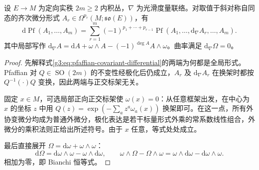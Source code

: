 \begin{lemma}\label{g3:lem:pfaffian-covariant-differential}
	设 \(E\to M\) 为定向实秩 \(2m\ge2\) 内积丛，\(\nabla\) 为光滑度量联络。对取值于斜对称自同态的齐次微分形式 \(A_r\in\Omega^{p_r}(M;\mathfrak{so}(E))\)，有
	\begin{equation}\label{g3:eq:pfaffian-covariant-differential}
		\mathrm d\operatorname{Pf}(A_1,\ldots,A_m)
		=\sum_{r=1}^m(-1)^{p_1+\cdots+p_{r-1}}
		\operatorname{Pf}(A_1,\ldots,\mathrm d_\nabla A_r,\ldots,A_m).
	\end{equation}
	其中局部写作 \(\mathrm d_\nabla A=\mathrm dA+\omega\wedge A-(-1)^{\deg A}A\wedge\omega\)。曲率满足 \(\mathrm d_\nabla\Omega=0\)。
\end{lemma}
\begin{proof}
	先解释式\eqref{g3:eq:pfaffian-covariant-differential}的两端为何都是全局形式。Pfaffian 对 \(Q\in\operatorname{SO}(2m)\) 的不变性经极化后仍成立，\(A_r\) 及 \(\mathrm d_\nabla A_r\) 在换架时都按 \(Q^{-1}(\cdot)Q\) 变换，因此两端与正交标架无关。

	固定 \(x\in M\)，可选局部正向正交标架使 \(\omega(x)=0\)：从任意框架出发，在中心为 \(x\) 的坐标 \(z\) 中用 \(Q(z)=\exp(-\sum_a z^a\omega_a(x))\) 换架即可。在这一点，所有外协变微分均成为普通外微分，极化表达是若干标量形式外乘的常系数线性组合，外微分的乘积法则正给出所述符号。由于 \(x\) 任意，等式处处成立。

	最后直接展开 \(\Omega=\mathrm d\omega+\omega\wedge\omega\)：
	\[
		\mathrm d\Omega=\mathrm d\omega\wedge\omega-\omega\wedge\mathrm d\omega,
		\qquad
		\omega\wedge\Omega-\Omega\wedge\omega
		=\omega\wedge\mathrm d\omega-\mathrm d\omega\wedge\omega.
	\]
	相加为零，即 Bianchi 恒等式。
\end{proof}

